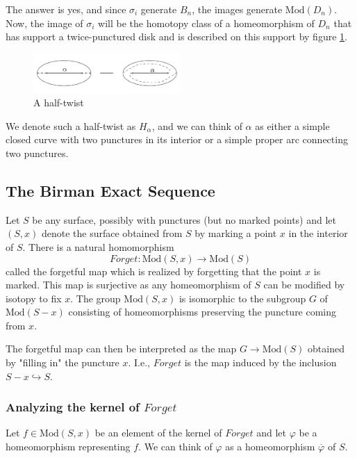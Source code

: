 \documentclass[reqno]{amsart}
\theoremstyle{definition}
\theoremstyle{remark}
\newcommand{\Mod}{{\mathrm{Mod}}}
\begin{document}
The answer is yes, and since $\sigma_i$ generate
$B_n$, the images generate $\Mod(D_n)$. Now, the
image of $\sigma_i$ will be the
homotopy class of a homeomorphism
of $D_n$ that has support a twice-punctured disk and is
described on this support by figure \ref{fig:half-twist-png}.

\begin{figure}[htpb]
    \centering
    \includegraphics[width=0.5\textwidth]{half-twist.png}
    \caption{A half-twist}
    \label{fig:half-twist-png}
\end{figure}

We denote such a half-twist as $H_{\alpha}$, and we
can think of $\alpha$ as either a simple closed
curve with two punctures in its interior or a simple
proper arc connecting two punctures.


\subsection{The Birman Exact Sequence}

Let $S$ be any surface, possibly with punctures (but no 
marked points) and let
$\left( S, x \right) $ denote the surface obtained
from $S$ by marking a point $x$ in the
interior of $S$. There is a natural
homomorphism
\[
Forget \colon \Mod \left( S, x \right) \to \Mod(S)
\] 
called the forgetful map which is realized by forgetting
that the point $x$ is marked. This map is
surjective as any homeomorphism of $S$ can
be modified by isotopy to fix $x$. The
group $\Mod(S,x)$ is isomorphic to the
subgroup $G$ of $\Mod \left( S - x \right) $ 
consisting of homeomorphisms preserving the
puncture coming from $x$.

The forgetful map can then be interpreted
as the map $G \to \Mod(S)$ obtained by "filling in" the
puncture $x$. I.e., $Forget$ is the map
induced by the inclusion
 $S -x \hookrightarrow S$.

 \subsubsection{Analyzing the kernel of $Forget$}

 Let $f \in \Mod(S,x)$ be an element of the kernel
 of $Forget$ and let  $\varphi $ be a homeomorphism
 representing $f$. We can think of
 $\varphi $ as a homeomorphism $\overline{\varphi}$ of
 $S$.
\end{document}
